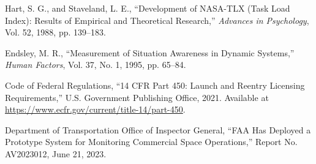 \documentclass[journal]{new-aiaa}
\begin{document}
\begin{thebibliography}{99}
 Hart, S. G., and Staveland, L. E., “Development of NASA-TLX (Task Load Index): Results of Empirical and Theoretical Research,” \textit{Advances in Psychology}, Vol. 52, 1988, pp. 139--183.

 Endsley, M. R., “Measurement of Situation Awareness in Dynamic Systems,” \textit{Human Factors}, Vol. 37, No. 1, 1995, pp. 65--84.

 Code of Federal Regulations, “14 CFR Part 450: Launch and Reentry Licensing Requirements,” U.S. Government Publishing Office, 2021. Available at \url{https://www.ecfr.gov/current/title-14/part-450}.

 Department of Transportation Office of Inspector General, “FAA Has Deployed a Prototype System for Monitoring Commercial Space Operations,” Report No. AV2023012, June 21, 2023.

\end{thebibliography}
\end{document}
